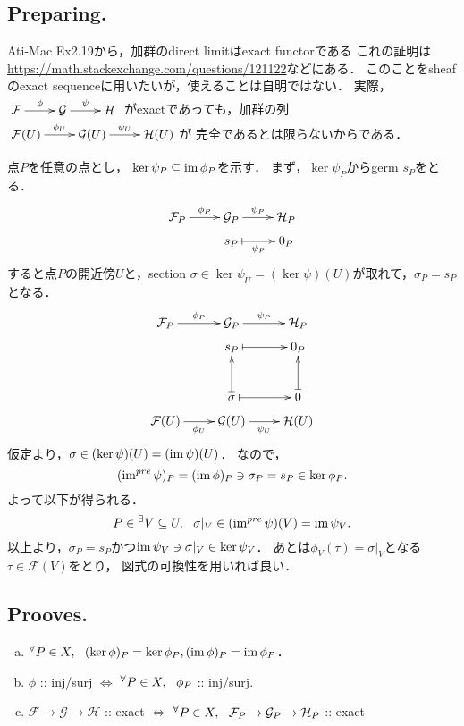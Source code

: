 \documentclass[a4paper]{jsarticle}
\newcommand{\shF}{\mathcal{F}}
\newcommand{\shG}{\mathcal{G}}
\newcommand{\shH}{\mathcal{H}}
\begin{document}
    \subsection{Preparing.}
    Ati-Mac Ex2.19から，加群のdirect limitはexact functorである
    これの証明は\url{https://math.stackexchange.com/questions/121122}などにある．
    このことをsheafのexact sequenceに用いたいが，使えることは自明ではない．
    実際，$\xymatrix{ \shF \ar[r]^-{\phi}& \shG \ar[r]^-{\psi}& \shH }$
    がexactであっても，加群の列
    $\xymatrix{ \shF(U) \ar[r]^-{\phi_U}& \shG(U) \ar[r]^-{\psi_U}& \shH(U) }$が
    完全であるとは限らないからである．

    点$P$を任意の点とし，
    $\ker \psi_P \subseteq \operatorname{im} \phi_P$を示す．
    まず，$\ker \psi_P$からgerm $s_P$をとる．
    \[
    \xymatrix@R=5pt
    {
    \shF_P \ar[r]^-{\phi_P}& \shG_P \ar[r]^-{\psi_P}& \shH_P \\
    {} & s_P \ar@{|->}[r]_-{\psi_P} & 0_P
    }
    \]
    すると点$P$の開近傍$U$と，section $\sigma \in \ker \psi_U=(\ker \psi)(U)$が取れて，$\sigma_P=s_P$となる．
    \[
    \xymatrix@R=5pt
    {
    \shF_P \ar[r]^-{\phi_P}& \shG_P \ar[r]^-{\psi_P}& \shH_P \\
    {} & s_P \ar@{|->}[r] & 0_P \\
    {} & {} & {} \\
    {} & {} & {} \\
    {} & \sigma \ar@{|->}[uuu] \ar@{|->}[r] & 0 \ar@{|->}[uuu]\\
    \shF(U) \ar[r]_-{\phi_U}& \shG(U) \ar[r]_-{\psi_U}& \shH(U) \\
    }
    \]
    仮定より，$\sigma \in (\ker \psi)(U)=(\operatorname{im} \psi)(U)$．
    なので，
    \[ (\operatorname{im}^{pre} \psi)_P=(\operatorname{im} \phi)_P \ni \sigma_P=s_P \in \ker \phi_P. \]
    よって以下が得られる．
    \[ P \in {}^{\exists}V \subseteq U,~~ \sigma|_V \in (\operatorname{im}^{pre} \psi)(V)=\operatorname{im} \psi_V. \]
    以上より，$\sigma_P=s_P$かつ$\operatorname{im} \psi_V \ni \sigma|_V \in \ker \psi_V$．
    あとは$\phi_V(\tau)=\sigma|_V$となる$\tau \in \shF(V)$をとり，
    図式の可換性を用いれば良い．

    \subsection{Prooves.}
    \begin{enumerate}[(a)]
        \item ${}^{\forall} P \in X,~~ (\ker \phi)_P=\ker \phi_P, (\operatorname{im} \phi)_P=\operatorname{im} \phi_P$．
        \item $\phi$ :: inj/surj $\iff$ ${}^{\forall} P \in X,~~ \phi_P$ :: inj/surj.
        \item $\shF \to \shG \to \shH$ :: exact $\iff$ $\Forall{P \in X} \shF_P \to \shG_P \to \shH_P$ :: exact
    \end{enumerate}
\end{document}
